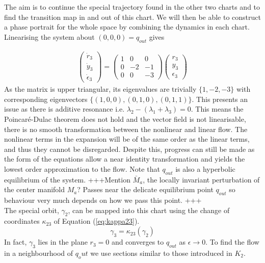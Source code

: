 The aim is to continue the special trajectory found in the other two charts and to find the transition map in and out of this chart. We will then be able to construct a phase portrait for the whole space by combining the dynamics in each chart.\\

Linearising the system about $(0,0,0)=q_{out}$ gives 

\begin{align*}
\begin{pmatrix}\dot{r}_3\\\dot{y}_3\\\dot{\epsilon}_3\end{pmatrix}= \begin{pmatrix}
1 & 0 & 0 \\ 
0 & -2 & -1 \\ 
0 & 0 & -3
\end{pmatrix} \begin{pmatrix}
r_3 \\ 
y_3 \\ 
\epsilon_3
\end{pmatrix} 
\end{align*}
As the matrix is upper triangular, its eigenvalues are trivially  $\lbrace 1,-2,-3\rbrace$ with corresponding eigenvectors $\lbrace (1,0,0),(0,1,0),(0,1,1)\rbrace$. This presents an issue as there is additive resonance i.e. $\lambda_2-(\lambda_1+\lambda_3)=0$.  This means the Poincar\'e-Dulac theorem does not hold and the vector field is not linearisable, there is no smooth transformation between the nonlinear and linear flow. The nonlinear terms in the expansion will be of the same order as the linear terms, and thus they cannot be disregarded. Despite this, progress can still be made as the form of the equations allow a near identity transformation and yields the lowest order approximation to the flow. Note that $q_{out}$ is also  a hyperbolic equilibrium of the system.  +++Mention $\bar{M}_a$, the locally invariant perturbation of the center manifold $M_a$? Passes near the delicate equilibrium point $q_{out}$ so behaviour very much depends on how we pass this point. +++\\

The special orbit, $\gamma_2$, can be mapped into this chart using the change of coordinates $\kappa_{23}$ of Equation (\ref{eq:kappa23}).
$$\gamma_3=\kappa_{23}(\gamma_2)$$
In fact, $\gamma_3$ lies in the plane $r_3=0$ and converges to $q_{out}$ as $\epsilon \to 0$. To find the flow in a neighbourhood of $q_out$ we use sections similar to those introduced in $K_2$.

